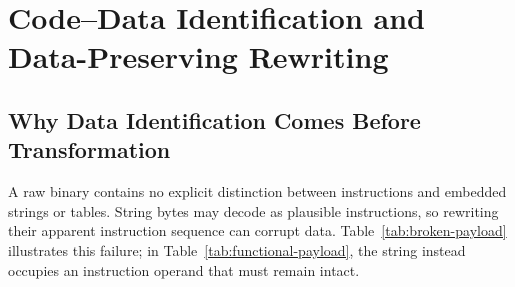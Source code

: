 \section{Code--Data Identification and Data-Preserving Rewriting}
\label{sec:code_data}
\subsection{Why Data Identification Comes Before Transformation}
A raw binary contains no explicit distinction between instructions and
embedded strings or tables. String bytes may decode as plausible
instructions, so rewriting their apparent instruction sequence can corrupt
data. Table~\ref{tab:broken-payload} illustrates this failure; in
Table~\ref{tab:functional-payload}, the string instead occupies an
instruction operand that must remain intact.

